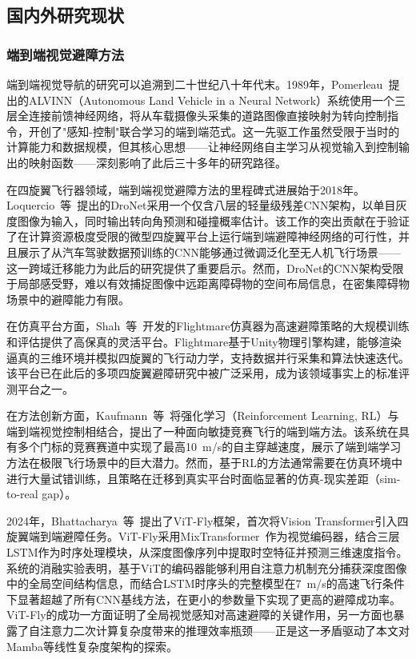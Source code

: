 \documentclass[12pt,a4paper]{article}
\numberwithin{equation}{section}
\numberwithin{figure}{section}
\numberwithin{table}{section}
\begin{document}
\subsection{国内外研究现状}
\label{sec:related}

\subsubsection{端到端视觉避障方法}

端到端视觉导航的研究可以追溯到二十世纪八十年代末。1989年，Pomerleau~\cite{pomerleau1989alvinn}提出的ALVINN（Autonomous Land Vehicle in a Neural Network）系统使用一个三层全连接前馈神经网络，将从车载摄像头采集的道路图像直接映射为转向控制指令，开创了"感知-控制"联合学习的端到端范式。这一先驱工作虽然受限于当时的计算能力和数据规模，但其核心思想——让神经网络自主学习从视觉输入到控制输出的映射函数——深刻影响了此后三十多年的研究路径。

在四旋翼飞行器领域，端到端视觉避障方法的里程碑式进展始于2018年。Loquercio~等~\cite{loquercio2018dronet}提出的DroNet采用一个仅含八层的轻量级残差CNN架构，以单目灰度图像为输入，同时输出转向角预测和碰撞概率估计。该工作的突出贡献在于验证了在计算资源极度受限的微型四旋翼平台上运行端到端避障神经网络的可行性，并且展示了从汽车驾驶数据预训练的CNN能够通过微调泛化至无人机飞行场景——这一跨域迁移能力为此后的研究提供了重要启示。然而，DroNet的CNN架构受限于局部感受野，难以有效捕捉图像中远距离障碍物的空间布局信息，在密集障碍物场景中的避障能力有限。

在仿真平台方面，Shah~等~\cite{shah2017flightmare}开发的Flightmare仿真器为高速避障策略的大规模训练和评估提供了高保真的灵活平台。Flightmare基于Unity物理引擎构建，能够渲染逼真的三维环境并模拟四旋翼的飞行动力学，支持数据并行采集和算法快速迭代。该平台已在此后的多项四旋翼避障研究中被广泛采用，成为该领域事实上的标准评测平台之一。

在方法创新方面，Kaufmann~等~\cite{kaufmann2020beauty}将强化学习（Reinforcement Learning, RL）与端到端视觉控制相结合，提出了一种面向敏捷竞赛飞行的端到端方法。该系统在具有多个门标的竞赛赛道中实现了最高10~m/s的自主穿越速度，展示了端到端学习方法在极限飞行场景中的巨大潜力。然而，基于RL的方法通常需要在仿真环境中进行大量试错训练，且策略在迁移到真实平台时面临显著的仿真-现实差距（sim-to-real gap）。

2024年，Bhattacharya~等~\cite{bhattacharya2024vitfly}提出了ViT-Fly框架，首次将Vision Transformer引入四旋翼端到端避障任务。ViT-Fly采用MixTransformer~\cite{xie2021segformer}作为视觉编码器，结合三层LSTM作为时序处理模块，从深度图像序列中提取时空特征并预测三维速度指令。系统的消融实验表明，基于ViT的编码器能够利用自注意力机制充分捕获深度图像中的全局空间结构信息，而结合LSTM时序头的完整模型在7~m/s的高速飞行条件下显著超越了所有CNN基线方法，在更小的参数量下实现了更高的避障成功率。ViT-Fly的成功一方面证明了全局视觉感知对高速避障的关键作用，另一方面也暴露了自注意力二次计算复杂度带来的推理效率瓶颈——正是这一矛盾驱动了本文对Mamba等线性复杂度架构的探索。
\end{document}
